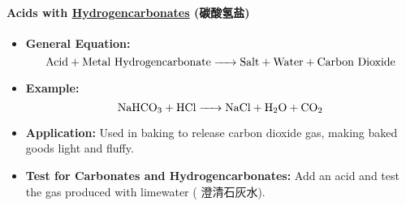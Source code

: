 \paragraph{Acids with \underline{Hydrogencarbonates} (碳酸氢盐)}
\begin{itemize}
    \item \textbf{General Equation:}
    \begin{equation}
        \ce{\text{Acid} + \text{Metal Hydrogencarbonate} -> \text{Salt} + \text{Water} + \text{Carbon Dioxide}}
    \end{equation}
    \item \textbf{Example:}
    \begin{equation}
        \ce{NaHCO3 + HCl -> NaCl + H2O + CO2}
    \end{equation}
    \item \textbf{Application:} Used in baking to release carbon dioxide gas, making baked goods light and fluffy.
    \item \textbf{Test for Carbonates and Hydrogencarbonates:} Add an acid and test the gas produced with limewater
    ( 澄清石灰水).
\end{itemize}